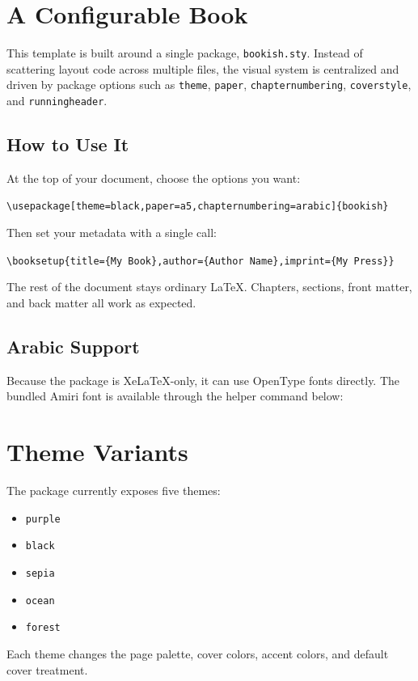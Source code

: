 \chapter{A Configurable Book}

This template is built around a single package, \texttt{bookish.sty}. Instead
of scattering layout code across multiple files, the visual system is
centralized and driven by package options such as \texttt{theme},
\texttt{paper}, \texttt{chapternumbering}, \texttt{coverstyle}, and
\texttt{runningheader}.

\section{How to Use It}

At the top of your document, choose the options you want:

\begin{bookcallout}
\verb|\usepackage[theme=black,paper=a5,chapternumbering=arabic]{bookish}|
\end{bookcallout}

Then set your metadata with a single call:

\begin{bookcallout}[Metadata]
\verb|\booksetup{title={My Book},author={Author Name},imprint={My Press}}|
\end{bookcallout}

The rest of the document stays ordinary LaTeX. Chapters, sections, front
matter, and back matter all work as expected.

\section{Arabic Support}

Because the package is XeLaTeX-only, it can use OpenType fonts directly. The
bundled Amiri font is available through the helper command below:

\begin{center}
\end{center}

\chapter{Theme Variants}

The package currently exposes five themes:

\begin{itemize}
  \item \texttt{purple}
  \item \texttt{black}
  \item \texttt{sepia}
  \item \texttt{ocean}
  \item \texttt{forest}
\end{itemize}

Each theme changes the page palette, cover colors, accent colors, and default
cover treatment.
